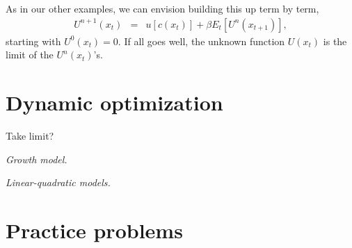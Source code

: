 \documentclass[11pt]{article}
\begin{document}
As in our other examples, we can envision building this up term by term, 
\begin{eqnarray*}
    U^{n+1}(x_t) &=&  u[c(x_{t})] + \beta E_t [U^n(x_{t+1})] , 
\end{eqnarray*}
starting with $U^0(x_t) = 0$.  
If all goes well, 
the unknown function $U(x_t)$ is the limit of the $U^n(x_t)$'s.  


\section{Dynamic optimization} 

Take limit?  


{\it Growth model.\/}

{\it Linear-quadratic models.\/} 


\section*{Practice problems}
\end{document}
